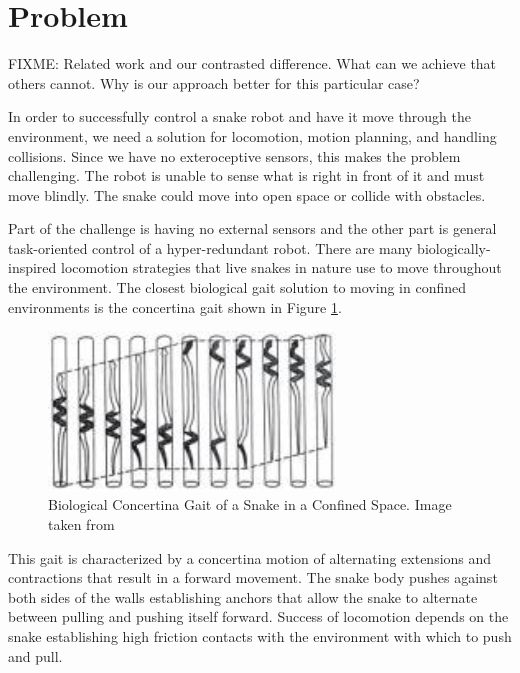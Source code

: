 
\section{Problem}

FIXME: Related work and our contrasted difference.  What can we achieve that others cannot.  Why is our approach better for this particular case?  

In order to successfully control a snake robot and have it move through the environment, we need a solution for locomotion, motion planning, and handling collisions.  Since we have no exteroceptive sensors, this makes the problem challenging.  The robot is unable to sense what is right in front of it and must move blindly.  The snake could move into open space or collide with obstacles.

Part of the challenge is having no external sensors and the other part is general task-oriented control of a hyper-redundant robot.  There are many biologically-inspired locomotion strategies that live snakes in nature use to move throughout the environment.  The closest biological gait solution to moving in confined environments is the concertina gait shown in Figure \ref{bio}.

\begin{figure}
  \begin{center}
    \includegraphics[width=3in]{concertina_gait_Gans1980.jpg}
  \end{center}
  \caption{Biological Concertina Gait of a Snake in a Confined Space.  Image taken from \cite{Gans:1980p775}}
	\label{bio}
\end{figure}

This gait is characterized by a concertina motion of alternating extensions and contractions that result in a forward movement. The snake body pushes against both sides of the walls establishing anchors that allow the snake to alternate between pulling and pushing itself forward. Success of locomotion depends on the snake establishing high friction contacts with the environment with which to push and pull.

